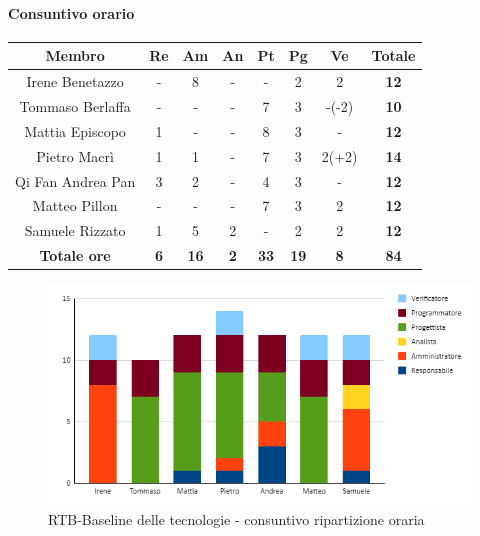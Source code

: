 \paragraph{Consuntivo orario}
\begin{center}
	\renewcommand{\arraystretch}{1.8}
	\begin{tabular}{ |c|c|c|c|c|c|c|c| }
	\hline
	\textbf{Membro} & \textbf{Re} & \textbf{Am} &  \textbf{An} &  \textbf{Pt} &  \textbf{Pg} &  \textbf{Ve} &  \textbf{Totale}\\
    \hline
    Irene Benetazzo   & - & 8 & - & - & 2 & 2 & \textbf{12} \\
    \hline
    Tommaso Berlaffa  & - & - & - & 7 & 3 & -(-2) & \textbf{10} \\
    \hline
    Mattia Episcopo   & 1 & - & - & 8 & 3 & - & \textbf{12} \\
    \hline
    Pietro Macrì      & 1 & 1 & - & 7 & 3 & 2(+2) & \textbf{14} \\
    \hline
    Qi Fan Andrea Pan & 3 & 2 & - & 4 & 3 & - & \textbf{12} \\
    \hline
    Matteo Pillon     & - & - & - & 7 & 3 & 2 & \textbf{12} \\
    \hline
    Samuele Rizzato   & 1 & 5 & 2 & - & 2 & 2 & \textbf{12} \\
    \hline
    \textbf{Totale ore} & \textbf{6} & \textbf{16} &  \textbf{2} &  \textbf{33} &  \textbf{19} &  \textbf{8} &  \textbf{84}\\
    \hline
	\end{tabular}
\end{center}
\begin{figure}[H]
    \centering\includegraphics[width=\textwidth, height=\textheight,keepaspectratio]{images/consuntivo/RTB-tecnologico-ore.png}
    \caption{RTB-Baseline delle tecnologie - consuntivo ripartizione oraria}
\end{figure}

